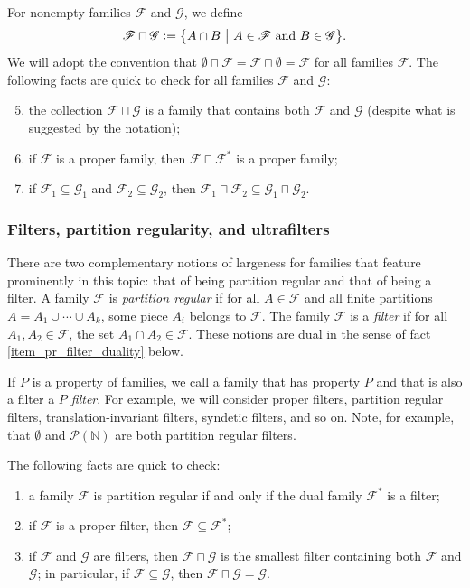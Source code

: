 \documentclass[letter,11pt]{article}
\theoremstyle{plain}
\theoremstyle{definition}
\theoremstyle{plain}
\theoremstyle{plain}
\numberwithin{equation}{section}
\newcommand{\N}{\mathbb{N}}
\newcommand{\defeq}{\vcentcolon=}
\newcommand{\classcap}{\sqcap}
\newcommand{\family}{\mathscr{F}}
\newcommand{\familyone}{\mathscr{F}}
\newcommand{\familytwo}{\mathscr{G}}
\newcommand{\familycap}{\sqcap}
\begin{document}
For nonempty families $\familyone$ and $\familytwo$, we define
\[\familyone \familycap \familytwo \defeq \big\{ A \cap B \ \big| \ A \in \familyone \text{ and } B \in \familytwo \big\}.\]
We will adopt the convention that $\emptyset \classcap \family = \family \classcap \emptyset = \family$ for all families $\family$.  The following facts are quick to check for all families $\family$ and $\familytwo$:
\begin{enumerate}
\setcounter{enumi}{4}
    \item the collection $\family \classcap \familytwo$ is a family that contains both $\family$ and $\familytwo$ (despite what is suggested by the notation);
    \item if $\familyone$ is a proper family, then $\familyone \classcap \familyone^*$ is a proper family;
    \item if $\family_1 \subseteq \familytwo_1$ and $\family_2 \subseteq \familytwo_2$, then $\family_1 \classcap \family_2 \subseteq \familytwo_1 \classcap \familytwo_2$.
\end{enumerate}


\subsubsection{Filters, partition regularity, and ultrafilters}
\label{sec_filter_pr_and_ufs}

There are two complementary notions of largeness for families that feature prominently in this topic: that of being partition regular and that of being a filter.  A family $\family$ is \emph{partition regular} if for all $A \in \family$ and all finite partitions $A = A_1 \cup \cdots \cup A_k$, some piece $A_i$ belongs to $\family$.  The family $\family$ is a \emph{filter} if for all $A_1, A_2 \in \family$, the set $A_1 \cap A_2 \in \family$.  These notions are dual in the sense of fact \eqref{item_pr_filter_duality} below.



If $P$ is a property of families, we call a family that has property $P$ and that is also a filter a \emph{$P$ filter}. For example, we will consider proper filters, partition regular filters, translation-invariant filters, syndetic filters, and so on. Note, for example, that $\emptyset$ and $\mathcal{P}(\N)$ are both partition regular filters.



The following facts are quick to check:
\begin{enumerate}
    \item \label{item_pr_filter_duality} a family $\family$ is partition regular if and only if the dual family $\family^*$ is a filter;
    \item if $\family$ is a proper filter, then $\family \subseteq \family^*$;
    \item \label{item_filter_containment} if $\familyone$ and $\familytwo$ are filters, then $\familyone \classcap \familytwo$ is the smallest filter containing both $\familyone$ and $\familytwo$; in particular, if $\family \subseteq \familytwo$, then $\family \classcap \familytwo = \familytwo$.\\ 
\end{enumerate}
\end{document}
